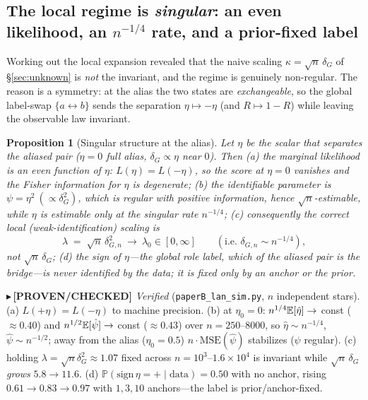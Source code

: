 \documentclass[11pt]{article}
\newtheorem{proposition}{Proposition}
\newcommand{\PROVEN}[1]{{\color{teal}\small$\blacktriangleright$\,\textbf{[PROVEN/CHECKED]} #1}}
\renewcommand{\Pr}{\mathbb{P}}\newcommand{\I}{\mathbb{I}}\newcommand{\HH}{\mathbb{H}}
\begin{document}
\subsection{The local regime is \emph{singular}: an even likelihood, an $n^{-1/4}$ rate, and a
prior-fixed label}\label{sec:localbayes}
Working out the local expansion revealed that the naive scaling $\kappa=\sqrt n\,\delta_G$ of \S\ref{sec:unknown}
is \emph{not} the invariant, and the regime is genuinely non-regular. The reason is a symmetry: at the alias the
two states are \emph{exchangeable}, so the global label-swap $\{a\leftrightarrow b\}$ sends the separation
$\eta\mapsto-\eta$ (and $R\mapsto1-R$) while leaving the observable law invariant.
\begin{proposition}[Singular structure at the alias]\label{prop:singular}
Let $\eta$ be the scalar that separates the aliased pair ($\eta{=}0$ full alias, $\delta_G\propto\eta$ near $0$).
Then (a) the marginal likelihood is an \emph{even} function of $\eta$: $L(\eta)=L(-\eta)$, so the score at
$\eta{=}0$ vanishes and the Fisher information for $\eta$ is \emph{degenerate}; (b) the identifiable parameter is
$\psi=\eta^2\ (\propto\delta_G^2)$, which is \emph{regular} with positive information, hence
$\sqrt n$-estimable, while $\eta$ is estimable only at the \emph{singular} rate $n^{-1/4}$; (c) consequently the
correct local (weak-identification) scaling is
\[
   \lambda \;=\; \sqrt n\,\delta_{G,n}^{2}\ \to\ \lambda_0\in[0,\infty]\qquad(\text{i.e. }\delta_{G,n}\sim n^{-1/4}),
\]
\emph{not} $\sqrt n\,\delta_G$; (d) the \emph{sign} of $\eta$---the global role label, which of the aliased pair
is the bridge---is \emph{never identified} by the data; it is fixed only by an anchor or the prior.
\end{proposition}
\PROVEN{\emph{Verified} (\texttt{paperB\_lan\_sim.py}, $n$ independent stars). (a) $L(+\eta)=L(-\eta)$ to machine
precision. (b) at $\eta_0{=}0$: $n^{1/4}\mathbb{E}[\hat\eta]\to$ const ($\approx0.40$) and $n^{1/2}\mathbb{E}[\hat\psi]\to$ const
($\approx0.43$) over $n{=}250$--$8000$, so $\hat\eta\sim n^{-1/4}$, $\hat\psi\sim n^{-1/2}$; away from the alias
($\eta_0{=}0.5$) $n\cdot\mathrm{MSE}(\hat\psi)$ stabilizes ($\psi$ regular). (c) holding $\lambda=\sqrt n\delta_G^2
\approx1.07$ fixed across $n{=}10^3$--$1.6{\times}10^4$ is invariant while $\sqrt n\,\delta_G$ \emph{grows}
$5.8\!\to\!11.6$. (d) $\Pr(\mathrm{sign}\,\eta{=}{+}\mid\text{data}){=}0.50$ with no anchor, rising
$0.61\to0.83\to0.97$ with $1,3,10$ anchors---the label is prior/anchor-fixed.}
\end{document}
